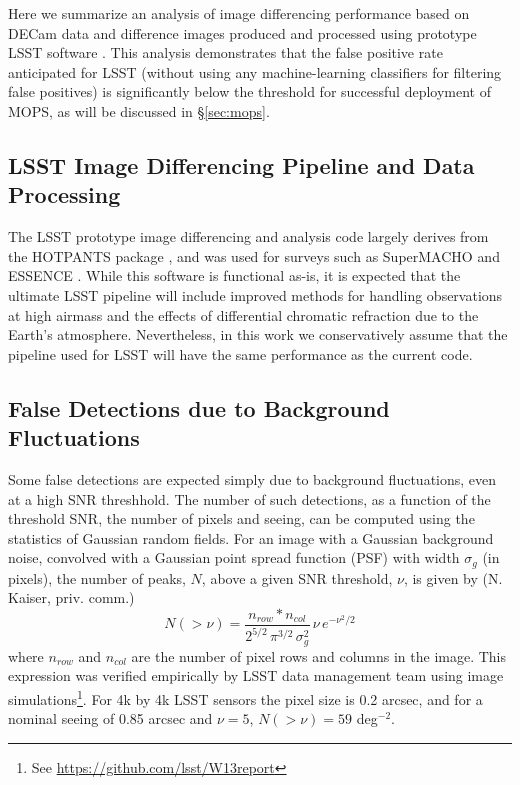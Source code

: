 Here we summarize an analysis of image differencing performance based on DECam
data and difference images produced and processed using prototype LSST
software \citep{DMTN-006}. This analysis demonstrates that the false
positive rate anticipated for LSST (without using any machine-learning classifiers for
filtering false positives) is significantly below the threshold for
successful deployment of MOPS, as will be discussed in \S\ref{sec:mops}.



\subsection{LSST Image Differencing Pipeline and Data Processing}

The LSST prototype image differencing and analysis code largely derives from the
HOTPANTS package \citep{becker15}, and was used for surveys such as SuperMACHO
\citep{becker05} and ESSENCE \citep{miknaitis07}. While this software is
functional as-is, it is expected that the ultimate LSST pipeline will include
improved methods for handling observations at high airmass and the effects of
differential chromatic refraction due to the Earth's atmosphere. Nevertheless, in
this work we conservatively assume that the pipeline used for LSST will have the
same performance as the current code.


\subsection{False Detections due to Background Fluctuations \label{sec:kaiser}}

Some false detections are expected simply due to background fluctuations, even
at a high SNR threshhold. The number of
such detections, as a function of the threshold SNR, the number of pixels and
seeing, can be computed using the statistics of Gaussian random fields.
For an image with a Gaussian background noise, convolved with a Gaussian point
spread function (PSF) with width $\sigma_g$ (in pixels), the number of peaks, $N$, above a
given SNR threshold, $\nu$, is given by (N. Kaiser, priv. comm.)
\begin{equation}
N(>\nu)  = \frac{n_{row}*n_{col}}{2^{5/2} \, \pi^{3/2} \, \sigma_g^2} \, \nu \, e^{-\nu^2 /2}
\label{eq-theory}
\end{equation}
where $n_{row}$ and $n_{col}$ are the number of pixel rows and columns in the image.
This expression was verified empirically by LSST data management team using
image simulations\footnote{See \url{https://github.com/lsst/W13report}}.
For 4k by 4k LSST sensors the pixel size is 0.2 arcsec, and for a nominal seeing
of 0.85 arcsec and $\nu=5$, $N(>\nu) = 59$ deg$^{-2}$.

